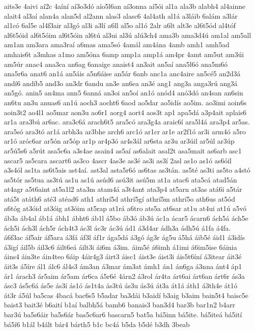 {aits3e
4aivi
aí2c
4aíní
aí3o3dó
aío5l6an
aí3onna
aí5ói
al1a
ala3b
alabh4
al4ainne
alait4
al3aí
alan4a
alan5d
al2ann
alas3
alasc6
4al4ath
al1á
a3láib
6alám
a3lár
al1có
6al5e
al4f3air
al3gó
al3i
a3lí
a6ll
al5o
al1ó
2alr
a6lt
alt3e
al6t5ód
al4tóf
al6t5óid
al6t5óim
al6t5óin
al6tú
al3ui
al3ú
alú3ch4
ama3b
ama3d4ú
am1al
am5all
am1an
am3ara
ama3raí
a6mas
ama5só
4amál
am4ána
4amb
amh1
amh5ad
amhais6t
a3mhas
a1mo
am5óna
6amp
amp1a
amp1á
am4pr
4amt
am5ut
am3úi
am5úr
anac4
ana3ca
an6ag
6anaige
anaist4
an3ait
an5aí
ana5l6ó
ana5m6ó
ana5r6a
anat6
an1á
an5áis
a5n6áise
an5ár
6anb
anc1a
anc4aire
an5cé5
an2d3á
andí6
andíb5
and3o
an3dr
6andu
an3e
an6ea
an3é
ang1
ang3a
anga3rú
ang3á
an5gó.
anin5
an4ma
ann5
6anná
an3oi
an5oí
an1ó
anód4
anó3dó
an4san
an6sin
an6tu
an3u
anuas6
an1ú
aoch3
aocht6
6aod
ao5dar
ao5idís
ao5im.
ao3imi
aoin6s
aoin3t2
ao4l1
ao5mar
aon3u
ao6r1
aorg4
aort4
aos3t
ap1
apa5dá
a3p4ait
aplais6
ar1a
ara3bú
ar6ac.
ara3c6á
arach6t5
ara5có
ara3g4a
araic6í
ara5l4á
ara3p4
ar5as.
ara5só
ara3tó
ar1á
arbh3a
ar3bhe
arch6
arc1ó
ar1cr
ar1e
ar2f1ó
ar3i
arm4ó
a5ro
ar1ó
aróc6ar
ar5ón
ar5óp
ar1p
ar4p3ó
ar4s3ál
ar6sta
ar3u
ar3úil
ar5úl
ar3úp
ar5ú5s6
a5rút
asa5c6a
a3s4ae
asain4
as5aí
as6alait
asal2t
asa5mait
as6arb
asc1
ascar5
as5cara
ascart6
as3co
4ascr
4as3e
as3é
as3i
as3í
2asl
as1o
as1ó
as6óil
a3s4ól
as1ta
as6t5ais
ast4aí.
ast3al
asta5r6ó
as6tas
as3tán.
as5té
as3ti
as5to
a4stó
as5tór
as5tua
as3tú
as1u
as1ú
asúd6
asú3it
asú5m
at1a
atac6
ata5cá
atad5án
at4agr
a5t6aint
at5a1l2
ata3m
atam4á
a3t4ant
ata3p4
at5arn
at3as
atá6i
a5tár
atá5t
atáth6
até3
atéad6
ath1
athrí5d
athrí5gí
athrí5m
athrí5o
ath6us
at5ód
a6tóg
at3óid
at3óig
at3óim
at5rap
at1rá
a6tro
ats5a
at6sar
at1u
at4ui
at1ú
a5vó
áb3a
áb4al
áb1á
ábh1
ábht6
áb1l
á5bo
áb3ó
áb3ú
ác1a
ácar5
ácarn6
ách5á
ách5e
ách5i
ách3l
ách5r
ách4t3
ác3l
ác3r
ác3ú
ád1
á3d4ar
ádh3a
ádh5ú
á1fa
á4fa.
á6f3ac
áf5air
áf5ara
á3fá
áf3l
áf1r
ága5dá
á3gó
ág3r
ág5u
á5há
áib5é
áid1
á3idís
á3igí
áil5b
áil3c6
áilt6eá
áilt3i
ái6m
á3im.
áim5é
á6imh
á1imi
á6im5ise
6áinia
áins4
áin3te
áin4teo
6áip
4áir4g3
áirt3
áisc1
áist3e
áist3i
áis5t6íní
á3itear
áit3é
áit3s
á5íre
ál1
álc6
ál4s3
ám3an
á3mar
ám3at
ámh1
án1
án6ga
á3nna
ánt4
áp1
ár1
árach3
ár5aim
ár5am
ár6ca
á5r6é
4árn2
á3rol
ár4ta
árt6ai
árt6an
árt6r
ás3a
ásc3
ás5c6á
ás5e
ás3í
ás1ó
ás1t4a
ás3tú
ás3u
ás3ú
át3a
át1á
áth1
á3th4e
át1ó
át3r
á5úl
ba5cas
4bacá
bac6s5
b5adar
ba3dái
b3aidí
b3aig
b3aim
bain5t4
baisc5e
baist3
bait3é
b6aití
b1aí
balbh5á
bamb6
banais3
ban3d4
bar3b
bar1n2
b4arr
bar3ú
ba5s6áir
ba5s6ár
bas5c6ar6
bascarn5
bat5a
bá5inn
bá5ite.
bá5iteá
bá5ití
bá5í6
b1ál
b4ált
bár4
bárth5
b1c
bc4á
b5da
b5dé
b3dh
3beab
}
